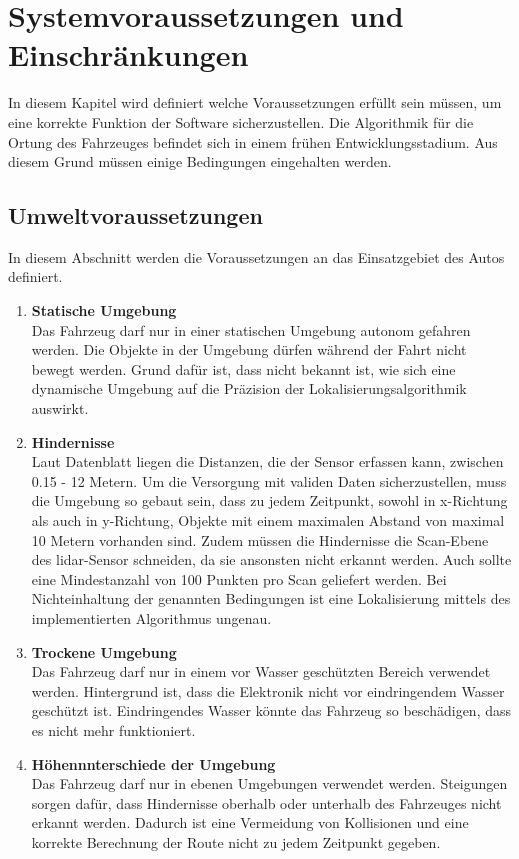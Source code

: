 \section{Systemvoraussetzungen und Ein\-schränkungen}
\label{umwelt}
In diesem Kapitel wird definiert welche Voraussetzungen erfüllt sein müssen, um eine korrekte Funktion der Software sicherzustellen.
Die Algorithmik für die Ortung des Fahrzeuges befindet sich in einem frühen Entwicklungsstadium. 
Aus diesem Grund müssen einige Bedingungen eingehalten werden. 

\subsection{Umweltvoraussetzungen}
In diesem Abschnitt werden die Voraussetzungen an das Einsatzgebiet des Autos definiert.

\begin{enumerate}[leftmargin=*]
    \item \textbf{Statische Umgebung} \\
    Das Fahrzeug darf nur in einer statischen Umgebung autonom gefahren werden. 
    Die Objekte in der Umgebung dürfen während der Fahrt nicht bewegt werden.
    Grund dafür ist, dass nicht bekannt ist, wie sich eine dynamische Umgebung auf die Präzision der Lokalisierungsalgorithmik auswirkt. 
    
    \item \textbf{Hindernisse} \\
    Laut Datenblatt \cite{Slamtec2020} liegen die Distanzen, die der Sensor erfassen kann, zwischen 0.15 - 12 Metern.
    Um die Versorgung mit validen Daten sicherzustellen, muss die Umgebung so gebaut sein, 
    dass zu jedem Zeitpunkt, sowohl in x-Richtung als auch in y-Richtung, Objekte mit einem maximalen Abstand von maximal 10 Metern vorhanden sind.
    Zudem müssen die Hindernisse die Scan-Ebene des \ac{lidar}-Sensor schneiden, da sie ansonsten nicht erkannt werden.
    Auch sollte eine Mindestanzahl von 100 Punkten pro Scan geliefert werden.
    Bei Nichteinhaltung der genannten Bedingungen ist eine Lokalisierung mittels des implementierten Algorithmus ungenau.
    
    \item \textbf{Trockene Umgebung} \\
    Das Fahrzeug darf nur in einem vor Wasser geschützten Bereich verwendet werden.
    Hintergrund ist, dass die Elektronik nicht vor eindringendem Wasser geschützt ist.
    Eindringendes Wasser könnte das Fahrzeug so beschädigen, dass es nicht mehr funktioniert.
   
    \item \textbf{Höhennnterschiede der Umgebung} \\
    Das Fahrzeug darf nur in ebenen Umgebungen verwendet werden. 
    Steigungen sorgen dafür, dass Hindernisse oberhalb oder unterhalb des Fahrzeuges nicht erkannt werden. Dadurch ist eine Vermeidung von Kollisionen 
    und eine korrekte Berechnung der Route nicht zu jedem Zeitpunkt gegeben.
\end{enumerate}

